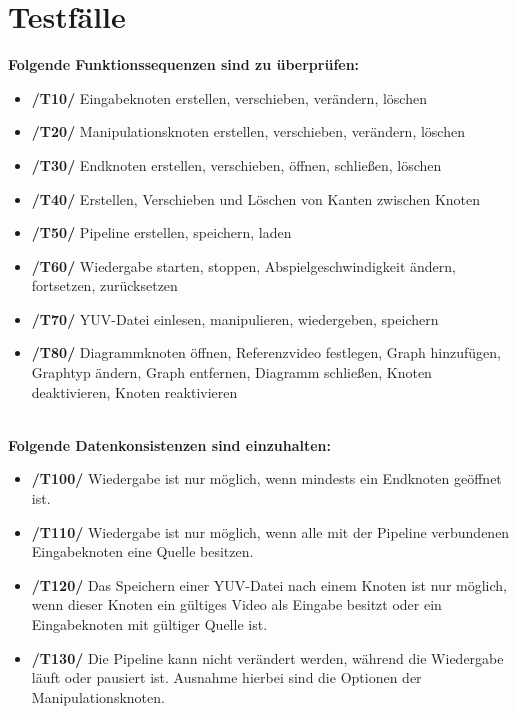 \section{Testfälle}

\textbf{Folgende Funktionssequenzen sind zu überprüfen:}
\begin{itemize}
	\item\textbf{/T10/} Eingabeknoten erstellen, verschieben, verändern, löschen
	\item\textbf{/T20/} Manipulationsknoten erstellen, verschieben, verändern, löschen
	\item\textbf{/T30/} Endknoten erstellen, verschieben, öffnen, schließen, löschen
	\item\textbf{/T40/} Erstellen, Verschieben und Löschen von Kanten zwischen Knoten
	\item\textbf{/T50/} Pipeline erstellen, speichern, laden
	\item\textbf{/T60/} Wiedergabe starten, stoppen, Abspielgeschwindigkeit ändern, fortsetzen, zurücksetzen
	\item\textbf{/T70/} YUV-Datei einlesen, manipulieren, wiedergeben, speichern
	\item\textbf{/T80/} Diagrammknoten öffnen, Referenzvideo festlegen, Graph hinzufügen, Graphtyp ändern, Graph entfernen, Diagramm schließen, Knoten deaktivieren, Knoten 
				reaktivieren
\end{itemize}

~\\

\textbf{Folgende Datenkonsistenzen sind einzuhalten:}
\begin{itemize}
	\item\textbf{/T100/} Wiedergabe ist nur möglich, wenn mindests ein Endknoten geöffnet ist.
	\item\textbf{/T110/} Wiedergabe ist nur möglich, wenn alle mit der Pipeline verbundenen Eingabeknoten eine Quelle besitzen.
	\item\textbf{/T120/} Das Speichern einer YUV-Datei nach einem Knoten ist nur möglich, wenn dieser Knoten ein gültiges Video als Eingabe besitzt oder ein Eingabeknoten mit 
				gültiger Quelle ist.
	\item\textbf{/T130/} Die Pipeline kann nicht verändert werden, während die Wiedergabe läuft oder pausiert ist. Ausnahme hierbei sind die Optionen der Manipulationsknoten.
\end{itemize}
